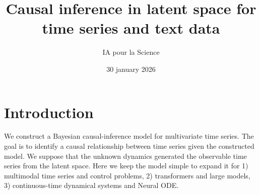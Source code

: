 \documentclass[12pt]{article}
\title{Causal inference in latent space for time series and text data}
\author{IA pour la Science}
\date{30 january 2026}
\begin{document}

\maketitle
\section*{Introduction}
We construct a Bayesian causal-inference model for multivariate time series.
The goal is to identify a causal relationship between time series given the constructed model.
We suppose that the unknown dynamics generated the observable time series from the latent space.
Here we keep the model simple to expand it for
    1) multimodal time series and control problems,
    2) transformers and large models,
    3) continuous-time dynamical systems and Neural ODE.
\end{document}
